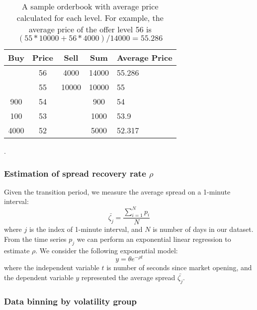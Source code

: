 \begin{table}[h]
  \centering
  \begin{tabular}{c|c|c|c|l}
    \hline
    \textbf{Buy} & \textbf{Price} & \textbf{Sell} & \textbf{Sum} & \multicolumn{1}{c}{\textbf{Average Price}} \\ \hline
                 & 56             & 4000          & 14000        & 55.286                                     \\ \hline
                 & 55             & 10000         & 10000        & 55                                         \\ \hline
    900          & 54             &               & 900          & 54                                         \\ \hline
    100          & 53             &               & 1000         & 53.9                                       \\ \hline
    4000         & 52             &               & 5000         & 52.317                                     \\ \hline
  \end{tabular}
  \caption{A sample orderbook with average price calculated for each level. For example, the average price of the offer level 56 is $(55*10000+56*4000)/14000 = 55.286$}.
  \label{tbl:bookAvgPxConversion}
\end{table}

\subsubsection{Estimation of spread recovery rate $\rho$}

Given the transition period, we measure the average spread on a 1-minute interval:
\[
  \bar{\zeta_j} = \frac{\sum_{i=1}^N p_i}{N}
\]
where $j$ is the index of 1-minute interval, and $N$ is number of days in our dataset. From the time series $p_j$ we can perform an exponential linear regression to estimate $\rho$. We consider the following exponential model:
\[
  y = \theta e^{-\rho t}
\]
where the independent variable $t$ is number of seconds since market opening, and the dependent variable $y$ represented the average spread $\bar{\zeta_j}$.

\subsubsection{Data binning by volatility group}

